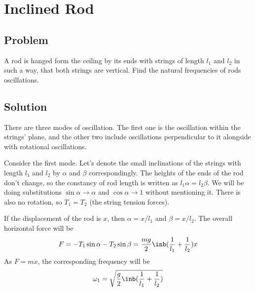 \section*{Inclined Rod}

\subsection*{Problem}

A rod is hanged form the ceiling by its ends with
strings of length $l_1$ and $l_2$ in such a way,
that both strings are vertical.
Find the natural frequencies of rods oscillations. 

\subsection*{Solution}

There are three modes of oscillation.
The first one is the oscillation within the strings' plane,
and the other two include oscillations perpendicular to it
alongside with rotational oscillations.

Consider the first mode.
Let's denote the small inclinations of the strings
with length $l_1$ and $l_2$ by $\alpha$ and $\beta$ correspondingly.
The heights of the ends of the rod don't change,
so the constancy of rod length is written as $l_1 \alpha = l_2 \beta$.
We will be doing substitutions $\sin{\alpha} \rightarrow \alpha$
and $\cos{\alpha} \rightarrow 1$ without mentioning it.
There is also no rotation, so $T_1 = T_2$ (the string tension forces).

If the displacement of the rod is $x$,
then $\alpha = x / l_1$ and $\beta = x / l_2$.
The overall horizontal force will be
\begin{equation}
    F = -T_1 \sin{\alpha} - T_2 \sin{\beta} =
    \frac{mg}{2}\inb({\frac{1}{l_1} + \frac{1}{l_2}}) x
\end{equation}
As $F = m \ddot{x}$, 
the corresponding frequency will be
\begin{equation}
    \omega_1 = \sqrt{\frac{g}{2} \inb({\frac{1}{l_1} + \frac{1}{l_2}})}
\end{equation}

